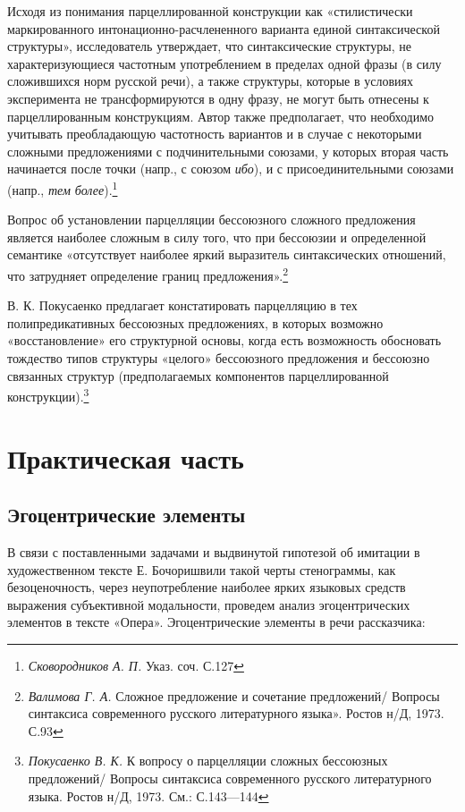 \documentclass{kursa4}
\begin{document}
{      {Исходя из понимания парцеллированной конструкции как «стилистически маркированного интонационно-расчлененного варианта единой синтаксической структуры», исследователь утверждает, что синтаксические структуры, не характеризующиеся частотным употреблением в пределах одной фразы (в силу сложившихся норм русской речи), а также структуры, которые в условиях эксперимента не трансформируются в одну фразу, не могут быть отнесены к парцеллированным конструкциям. Автор также предполагает, что необходимо учитывать преобладающую частотность вариантов и в случае с некоторыми сложными предложениями с подчинительными союзами, у которых вторая часть начинается после точки (напр., с союзом }\textit{{ибо}}{), и с присоединительными союзами (напр., }\textit{{тем более}}{).}\footnote{\textit{{ Сковородников А. П. }}{Указ. соч. С.127}}

      {Вопрос об установлении парцелляции бессоюзного сложного предложения является наиболее сложным в силу того, что при бессоюзии и определенной семантике «отсутствует наиболее яркий выразитель синтаксических отношений, что затрудняет определение границ предложения».}\footnote{{ }\textit{{Валимова Г. А. }}{Сложное предложение и сочетание предложений/ Вопросы синтаксиса современного русского литературного языка». Ростов н/Д, 1973. С.93}}

      {В. К. Покусаенко предлагает констатировать парцелляцию в тех полипредикативных бессоюзных предложениях, в которых возможно «восстановление» его структурной основы, когда есть возможность обосновать тождество типов структуры «целого» бессоюзного предложения и бессоюзно связанных структур (предполагаемых компонентов парцеллированной конструкции).}\footnote{{ }\textit{{Покусаенко В. К. }}{К вопросу о парцелляции сложных бессоюзных предложений/ Вопросы синтаксиса современного русского литературного языка. Ростов н/Д, 1973. См.: С.143—144}}

  \chapter{Практическая часть}

    \section{Эгоцентрические элементы}

      В связи с поставленными задачами и выдвинутой гипотезой об имитации в художественном тексте Е. Бочоришвили такой черты стенограммы, как безоценочность, через неупотребление наиболее ярких языковых средств выражения субъективной модальности, проведем анализ эгоцентрических элементов в тексте «Опера». Эгоцентрические элементы в речи рассказчика:

}
\end{document}
